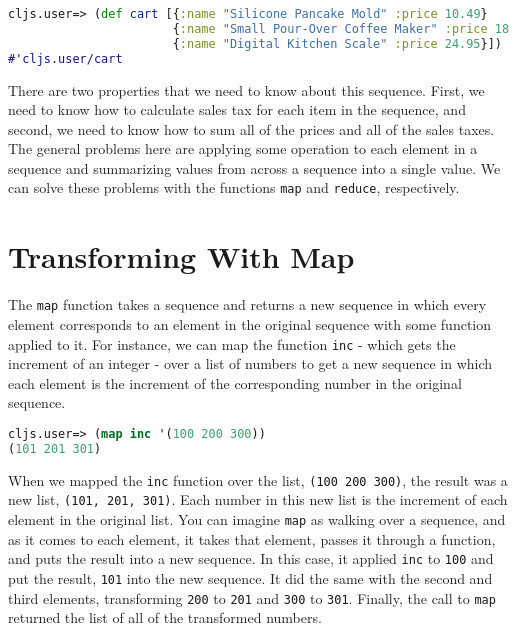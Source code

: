\documentclass[10pt,twoside,openright]{memoir}
\begin{document}
\begin{lstlisting}[language=Clojure, caption={Modeling a shopping cart}]
cljs.user=> (def cart [{:name "Silicone Pancake Mold" :price 10.49}
                       {:name "Small Pour-Over Coffee Maker" :price 18.96}
                       {:name "Digital Kitchen Scale" :price 24.95}])
#'cljs.user/cart
\end{lstlisting}

There are two properties that we need to know about this sequence. First,
we need to know how to calculate sales tax for each item in the
sequence, and second, we need to know how to sum all of the prices and
all of the sales taxes. The general problems here are applying some
operation to each element in a sequence and summarizing values from
across a sequence into a single value. We can solve these problems with
the functions \texttt{map} and \texttt{reduce}, respectively.


\section{Transforming With Map}

The \texttt{map} function takes a sequence and returns a new sequence in
which every element corresponds to an element in the original sequence
with some function applied to it. For instance, we can map the function
\texttt{inc} - which gets the increment of an integer - over a list of
numbers to get a new sequence in which each element is the increment of
the corresponding number in the original sequence.

\begin{lstlisting}[language=Clojure]
cljs.user=> (map inc '(100 200 300))
(101 201 301)
\end{lstlisting}

When we mapped the \texttt{inc} function over the list,
\texttt{(100\ 200\ 300)}, the result was a new list,
\texttt{(101,\ 201,\ 301)}. Each number in this new list is the
increment of each element in the original list. You can imagine
\texttt{map} as walking over a sequence, and as it comes to each
element, it takes that element, passes it through a function, and puts
the result into a new sequence. In this case, it applied \texttt{inc} to
\texttt{100} and put the result, \texttt{101} into the new sequence. It
did the same with the second and third elements, transforming
\texttt{200} to \texttt{201} and \texttt{300} to \texttt{301}. Finally,
the call to \texttt{map} returned the list of all of the transformed
numbers.
\end{document}
